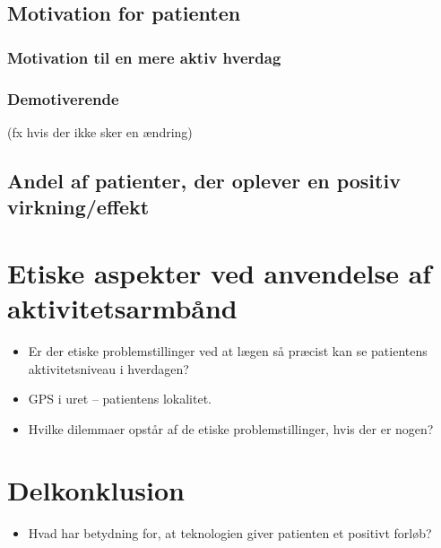 \subsection{Motivation for patienten}
\subsubsection{Motivation til en mere aktiv hverdag}
\subsubsection{Demotiverende}
(fx hvis der ikke sker en ændring)
\subsection{Andel af patienter, der oplever en positiv virkning/effekt}

\section{Etiske aspekter ved anvendelse af aktivitetsarmbånd}
\begin{itemize}
\item Er der etiske problemstillinger ved at lægen så præcist kan se patientens aktivitetsniveau i hverdagen?
\item GPS i uret – patientens lokalitet.
\item Hvilke dilemmaer opstår af de etiske problemstillinger, hvis der er nogen?
\end{itemize}

\section{Delkonklusion}
\begin{itemize}
\item Hvad har betydning for, at teknologien giver patienten et positivt forløb?
\end{itemize}

